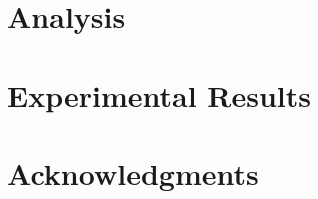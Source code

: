 \documentclass[journal]{IEEEtran}
\begin{document}
  \section{Analysis}
  

  \section{Experimental Results} 
  

  \section*{Acknowledgments}
  

  \begingroup
    
    
  \endgroup
\end{document}
